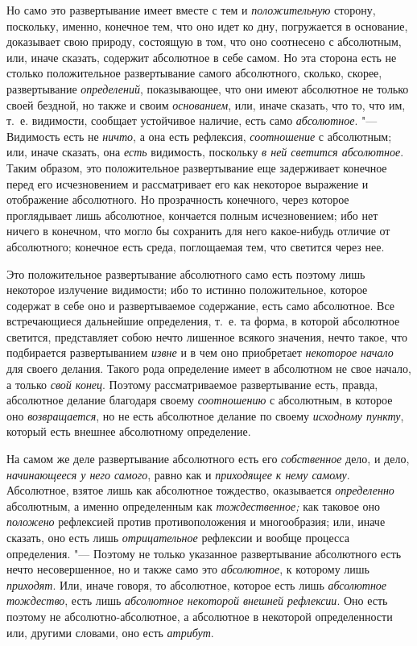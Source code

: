 Но само это развертывание имеет вместе с тем и
{\em положительную} сторону, поскольку, именно,
конечное тем, что оно идет ко дну, погружается в основание, доказывает свою
природу, состоящую в том, что оно соотнесено с абсолютным, или, иначе
сказать, содержит абсолютное в себе самом. Но эта сторона есть не столько
положительное развертывание самого абсолютного, сколько, скорее,
развертывание {\em определений}, показывающее, что они
имеют абсолютное не только своей бездной, но также и своим
{\em основанием}, или, иначе сказать, что то, что им,
т.~е. видимости, сообщает устойчивое наличие, есть само
{\em абсолютное}. "--- Видимость есть не
{\em ничто}, а она есть рефлексия,
{\em соотношение} с абсолютным; или, иначе сказать, она
{\em есть} видимость, поскольку
{\em в ней светится абсолютное}. Таким образом, это
положительное развертывание еще задерживает конечное перед его
исчезновением и рассматривает его как некоторое выражение и отображение
абсолютного. Но прозрачность конечного, через которое проглядывает лишь
абсолютное, кончается полным исчезновением; ибо нет ничего в конечном, что
могло бы сохранить для него какое-нибудь отличие от абсолютного; конечное
есть среда, поглощаемая тем, что светится через нее.

Это положительное развертывание абсолютного само есть поэтому лишь некоторое
излучение видимости; ибо то истинно положительное, которое содержат в себе
оно и развертываемое содержание, есть само абсолютное. Все встречающиеся
дальнейшие определения, т.~е. та форма, в которой абсолютное светится,
представляет собою нечто лишенное всякого значения, нечто такое, что
подбирается развертыванием {\em извне} и в чем оно
приобретает {\em некоторое начало} для своего делания.
Такого рода определение имеет в абсолютном не свое начало, а только
{\em свой конец}. Поэтому рассматриваемое развертывание
есть, правда, абсолютное делание благодаря своему
{\em соотношению} с абсолютным, в которое оно
{\em возвращается}, но не есть абсолютное делание по
своему {\em исходному пункту}, который есть внешнее
абсолютному определение.

На самом же деле развертывание абсолютного есть его
{\em собственное} дело, и дело,
{\em начинающееся у него самого}, равно как и
{\em приходящее к нему самому}. Абсолютное, взятое лишь
как абсолютное тождество, оказывается {\em определенно}
абсолютным, а именно определенным как
{\em тождественное;} как таковое оно
{\em положено} рефлексией против противоположения и
многообразия; или, иначе сказать, оно есть лишь
{\em отрицательное} рефлексии и вообще процесса
определения. "--- Поэтому не только указанное развертывание абсолютного есть
нечто несовершенное, но и также само это
{\em абсолютное}, к которому лишь
{\em приходят}. Или, иначе говоря, то абсолютное,
которое есть лишь {\em абсолютное тождество}, есть лишь
{\em абсолютное некоторой внешней рефлексии}. Оно есть
поэтому не абсолютно-абсолютное, а абсолютное в некоторой определенности
или, другими словами, оно есть {\em атрибут}.

